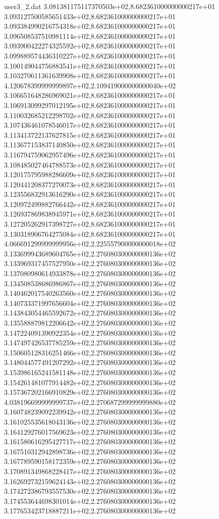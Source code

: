 \begin{filecontents}{user3_2.dat}
3.081381175117370503e+02,8.682361000000000217e+01
3.093127500585651433e+02,8.682361000000000217e+01
3.093384990216754318e+02,8.682361000000000217e+01
3.096508537510981114e+02,8.682361000000000217e+01
3.093900422274325592e+02,8.682361000000000217e+01
3.099889574436310227e+02,8.682361000000000217e+01
3.100149044756883541e+02,8.682361000000000217e+01
3.103270611361639908e+02,8.682361000000000217e+01
4.120678399999999897e+02,2.109419000000000040e+02
3.106651648286969021e+02,8.682361000000000217e+01
3.106913099297012195e+02,8.682361000000000217e+01
3.110032685212298702e+02,8.682361000000000217e+01
3.107436461078546017e+02,8.682361000000000217e+01
3.113413722137627815e+02,8.682361000000000217e+01
3.113677153837140850e+02,8.682361000000000217e+01
3.116794759062957496e+02,8.682361000000000217e+01
3.108485027464788573e+02,8.682361000000000217e+01
3.120175795988286609e+02,8.682361000000000217e+01
3.120441208377270073e+02,8.682361000000000217e+01
3.123556832913616290e+02,8.682361000000000217e+01
3.120972499882766442e+02,8.682361000000000217e+01
3.126937869838945971e+02,8.682361000000000217e+01
3.127205262917398727e+02,8.682361000000000217e+01
3.130318906764275084e+02,8.682361000000000217e+01
4.066691299999999956e+02,2.225557900000000018e+02
3.133699943689604765e+02,2.276080300000000136e+02
3.133969317457527950e+02,2.276080300000000136e+02
3.137080980614933878e+02,2.276080300000000136e+02
3.134508538686986867e+02,2.276080300000000136e+02
3.140462017540263560e+02,2.276080300000000136e+02
3.140733371997656604e+02,2.276080300000000136e+02
3.143843054465592672e+02,2.276080300000000136e+02
3.135588879812206642e+02,2.276080300000000136e+02
3.147224091390922354e+02,2.276080300000000136e+02
3.147497426537785259e+02,2.276080300000000136e+02
3.150605128316251466e+02,2.276080300000000136e+02
3.148044577491207292e+02,2.276080300000000136e+02
3.153986165241581148e+02,2.276080300000000136e+02
3.154261481077914482e+02,2.276080300000000136e+02
3.157367202166910829e+02,2.276080300000000136e+02
4.038196699999999737e+02,2.270687299999999880e+02
3.160748239092239942e+02,2.276080300000000136e+02
3.161025535618043136e+02,2.276080300000000136e+02
3.164129276017569623e+02,2.276080300000000136e+02
3.161580616295427717e+02,2.276080300000000136e+02
3.167510312942898736e+02,2.276080300000000136e+02
3.167789590158172359e+02,2.276080300000000136e+02
3.170891349868228417e+02,2.276080300000000136e+02
3.162692732159624143e+02,2.276080300000000136e+02
3.174272386793557530e+02,2.276080300000000136e+02
3.174553644698301014e+02,2.276080300000000136e+02
3.177653423718887211e+02,2.276080300000000136e+02

\end{filecontents}
